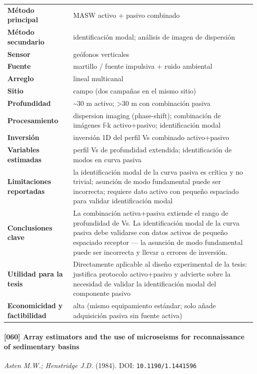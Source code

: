 \begin{center}\scriptsize
\begin{tabularx}{\textwidth}{@{}>{\bfseries}p{3.3cm} X@{}}
\toprule
M\'etodo principal & MASW activo + pasivo combinado \\
M\'etodo secundario & identificación modal; análisis de imagen de dispersión \\
Sensor & geófonos verticales \\
Fuente & martillo / fuente impulsiva + ruido ambiental \\
Arreglo & lineal multicanal \\
Sitio & campo (dos campañas en el mismo sitio) \\
Profundidad & \textasciitilde{}30 m activo; >30 m con combinación pasiva \\
Procesamiento & dispersion imaging (phase-shift); combinación de imágenes f-k activo+pasivo; identificación modal \\
Inversi\'on & inversión 1D del perfil Vs combinado activo+pasivo \\
Variables estimadas & perfil Vs de profundidad extendida; identificación de modos en curva pasiva \\
Limitaciones reportadas & la identificación modal de la curva pasiva es crítica y no trivial; asunción de modo fundamental puede ser incorrecta; requiere dato activo con pequeño espaciado para validar identificación modal \\
Conclusiones clave & La combinación activa+pasiva extiende el rango de profundidad de Vs. La identificación modal de la curva pasiva debe validarse con datos activos de pequeño espaciado receptor --- la asunción de modo fundamental puede ser incorrecta y llevar a errores de inversión. \\
Utilidad para la tesis & Directamente aplicable al diseño experimental de la tesis: justifica protocolo activo+pasivo y advierte sobre la necesidad de validar la identificación modal del componente pasivo \\
Economicidad y factibilidad & alta (mismo equipamiento estándar; solo añade adquisición pasiva sin fuente activa) \\
\bottomrule
\end{tabularx}
\end{center}

\paragraph{[060] Array estimators and the use of microseisms for reconnaissance of sedimentary basins} \emph{Asten M.W.; Henstridge J.D.} (1984).
{\scriptsize DOI: \texttt{10.1190/1.1441596}}

